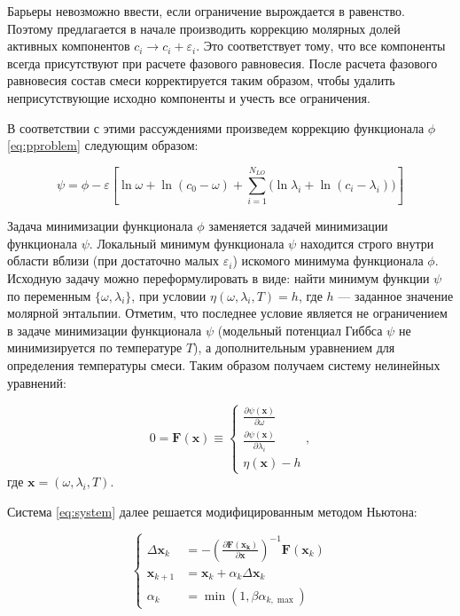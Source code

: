 \documentclass[12pt]{article}
\newcommand{\pd}[2]{\frac{\partial #1}{\partial #2}}
\renewcommand{\epsilon}{\varepsilon}
\begin{document}
Барьеры невозможно ввести, если ограничение вырождается в равенство. Поэтому предлагается в начале производить коррекцию молярных долей активных компонентов $c_i \rightarrow c_i + \epsilon_i$. Это соответствует тому, что все компоненты всегда присутствуют при расчете фазового равновесия. После расчета фазового равновесия состав смеси корректируется таким образом, чтобы удалить неприсутствующие исходно компоненты и учесть все ограничения. 

В соответствии с этими рассуждениями произведем коррекцию функционала $\phi$ \eqref{eq:pproblem} следующим образом:

\begin{equation}
\psi = \phi - \varepsilon \left[ \ln \omega + \ln (c_0 - \omega) + \sum_{i=1}^{N_{LO}} \Big( \ln \lambda_i + \ln (c_i - \lambda_i) \Big) \right]
\end{equation}

Задача минимизации функционала $\phi$ заменяется задачей минимизации функционала $\psi$. Локальный минимум функционала $\psi$ находится строго внутри области вблизи (при достаточно малых $\epsilon_i$) искомого минимума функционала $\phi$. Исходную задачу можно переформулировать в виде: найти минимум функции $\psi$ по переменным $\{\omega, \lambda_i\}$, при условии $\eta(\omega, \lambda_i, T) = h$, где $h$ --- заданное значение молярной энтальпии. Отметим, что последнее условие является не ограничением в задаче минимизации функционала $\psi$ (модельный потенциал Гиббса $\psi$ не минимизируется по температуре $T$), а дополнительным уравнением для определения температуры смеси. Таким образом получаем систему нелинейных уравнений:

\begin{equation}
0 = \mathbf{F}(\mathbf{x}) \equiv
\begin{cases}
 \pd{\psi(\mathbf{x})}{\omega}\\
 \pd{\psi(\mathbf{x})}{\lambda_i}\\
 \eta(\mathbf{x}) - h
\end{cases},
\label{eq:system}
\end{equation}
где $\mathbf{x} = (\omega, \lambda_i, T)$.

Система \eqref{eq:system} далее решается модифицированным методом Ньютона:

\begin{equation}
\left\{
\begin{aligned}
\Delta \mathbf{x}_k &= -\left(\pd{\mathbf{F(\mathbf{x}_k)}}{\mathbf{x}}\right)^{-1}
\mathbf{F}(\mathbf{x}_k)\\
\mathbf{x}_{k+1} &= \mathbf{x}_k + \alpha_k \Delta \mathbf{x}_k\\
\alpha_k &= \min(1, \beta \alpha_{k, \max})
\end{aligned}
\right. \label{eq:newton}
\end{equation}
\end{document}
